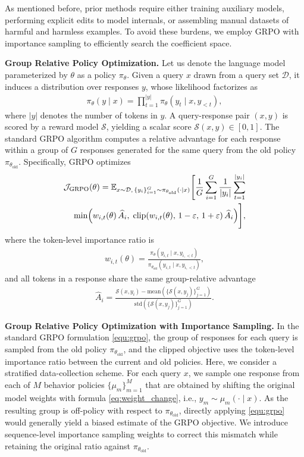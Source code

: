 
As mentioned before, prior methods require either training auxiliary models, performing explicit edits to model internals, or assembling manual datasets of harmful and harmless examples. To avoid these burdens, we employ GRPO with importance sampling to efficiently search the coefficient space.

\textbf{Group Relative Policy Optimization.}
Let us denote the language model parameterized by $\theta$ as a policy $\pi_\theta$.
Given a query $x$ drawn from a query set $\mathcal{D}$, it induces a distribution over responses $y$, whose likelihood factorizes as 
\begin{align*}
\pi_\theta(y\mid x)=\prod_{t=1}^{|y|}\pi_\theta(y_t\mid x,y_{<t}),
\end{align*} where $|y|$ denotes the number of tokens in $y$.
A query-response pair $(x,y)$ is scored by a reward model $\mathcal{S}$, yielding a scalar score $\mathcal{S}(x,y)\in[0,1]$.
The standard GRPO algorithm computes a relative advantage for each response within a group of $G$ responses generated for the same query from the old policy $\pi_{\theta_\text{old}}$.
Specifically, GRPO optimizes
\begin{align}
\label{equ:grpo}
\mathcal{J}_\text{GRPO}(\theta) =
\mathbb{E}_{x \sim \mathcal{D},\, \{y_i\}_{i=1}^{G} \sim \pi_{\theta_\text{old}}(\cdot \mid x)}
\Bigg[
\frac{1}{G}\sum_{i=1}^{G}\frac{1}{|y_i|}\sum_{t=1}^{|y_i|}
\notag\\
\min\!\Big(
w_{i,t}(\theta)\,\widehat{A}_{i},\;
\mathrm{clip}\!\left(w_{i,t}(\theta),\,1-\varepsilon,\,1+\varepsilon\right)\widehat{A}_{i}
\Big)
\Bigg],
\end{align}
where the token-level importance ratio is 
\begin{align*}
    w_{i,t}(\theta)=\frac{\pi_\theta(y_{i,t}\mid x,y_{i,<t})}{\pi_{\theta_\text{old}}(y_{i,t}\mid x,y_{i,<t})},
\end{align*} and all tokens in a response share the same group-relative advantage
\begin{align*}
\widehat{A}_{i}=\frac{\mathcal{S}(x,y_i)-\mathrm{mean}(\{\mathcal{S}(x,y_j)\}_{j=1}^{G})}{\mathrm{std}(\{\mathcal{S}(x,y_j)\}_{j=1}^{G})}.
\end{align*}

\textbf{Group Relative Policy Optimization with Importance Sampling.}
In the standard GRPO formulation \eqref{equ:grpo}, the group of responses for each query is sampled from the old policy $\pi_{\theta_\text{old}}$, and the clipped objective uses the token-level importance ratio between the current and old policies.
Here, we consider a stratified data-collection scheme. For each query $x$, we sample one response from each of $M$ behavior policies $\{\mu_m\}_{m=1}^M$ that are obtained by shifting the original model weights with formula \eqref{eq:weight_change}, i.e., $y_m \sim \mu_m(\cdot \mid x)$.
As the resulting group is off-policy with respect to $\pi_{\theta_\text{old}}$, directly applying \eqref{equ:grpo} would generally yield a biased estimate of the GRPO objective.
We introduce sequence-level importance sampling weights to correct this mismatch while retaining the original ratio against $\pi_{\theta_\text{old}}$.

